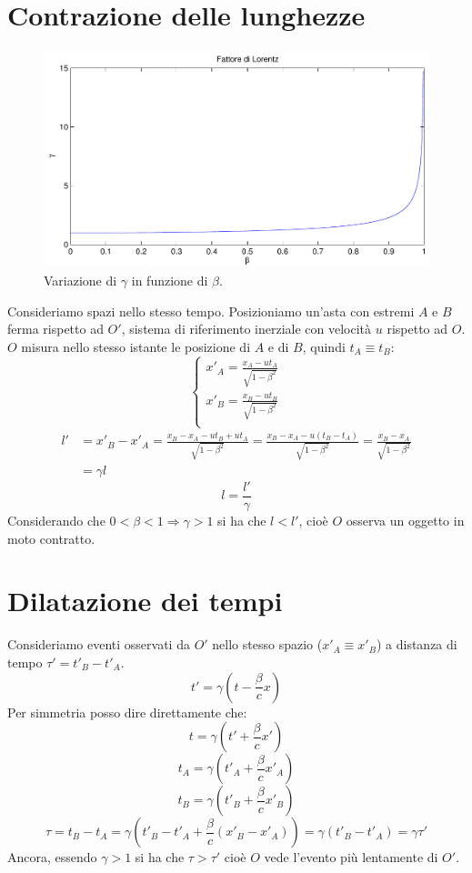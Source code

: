 \section{Contrazione delle lunghezze}
\begin{figure}[htbp]
   \centering
   \includegraphics[scale=0.5]{immagini/fisica1/beta_gamma}
   \caption{Variazione di $\gamma$ in funzione di $\beta$.}
\end{figure}
Consideriamo spazi nello stesso tempo. Posizioniamo un'asta con estremi $A$ e $B$ ferma rispetto ad $O'$, sistema di riferimento inerziale con velocità $u$ rispetto ad $O$.
$O$ misura nello stesso istante le posizione di $A$ e di $B$, quindi $t_A\equiv t_B$:
\[\left\{
\begin{array}{l}
x'_A=\frac{x_A-ut_A}{\sqrt{1-\beta^2}}\\
x'_B=\frac{x_B-ut_B}{\sqrt{1-\beta^2}}\\
\end{array}
\right.\]
\begin{align*}
l'&=x'_B-x'_A=\frac{x_B-x_A-ut_B+ut_A}{\sqrt{1-\beta^2}}=\frac{x_B-x_A-u(t_B-t_A)}{\sqrt{1-\beta^2}}=\frac{x_B-x_A}{\sqrt{1-\beta^2}}\\
&=\gamma l
\end{align*}
\begin{equation}
l=\frac{l'}{\gamma}
\end{equation}
Considerando che $0<\beta<1\Rightarrow\gamma>1$ si ha che $l<l'$, cioè $O$ osserva un oggetto in moto contratto.

\section{Dilatazione dei tempi}
Consideriamo eventi osservati da $O'$ nello stesso spazio ($x'_A\equiv x'_B$) a distanza di tempo $\tau'=t'_B-t'_A$.
\[t'=\gamma\left(t-\frac{\beta}{c}x\right)\]
Per simmetria posso dire direttamente che:
\[t=\gamma\left(t'+\frac{\beta}{c}x'\right)\]
\[t_A=\gamma\left(t'_A+\frac{\beta}{c}x'_A\right)\]
\[t_B=\gamma\left(t'_B+\frac{\beta}{c}x'_B\right)\]
\begin{equation}
\tau=t_B-t_A=\gamma\left(t'_B-t'_A+\frac{\beta}{c}\left(x'_B-x'_A\right)\right)=\gamma\left(t'_B-t'_A\right)=\gamma\tau'
\end{equation}
Ancora, essendo $\gamma>1$ si ha che $\tau>\tau'$ cioè $O$ vede l'evento più lentamente di $O'$.

